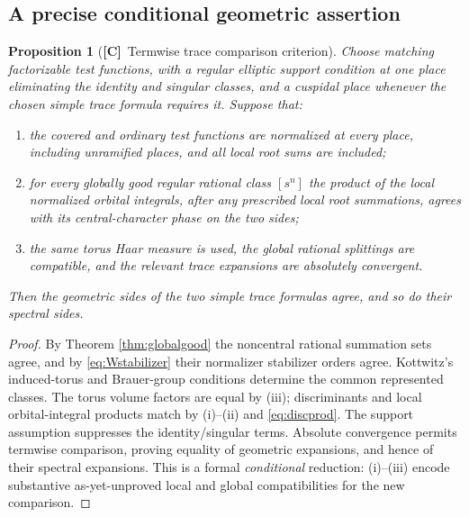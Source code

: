 \documentclass[11pt]{article}
\newcommand{\Ctag}{\textnormal{\textbf{[C]}}}
\theoremstyle{plain}
\newtheorem{proposition}[theorem]{Proposition}
\theoremstyle{definition}
\begin{document}
\subsection{A precise conditional geometric assertion}
\begin{proposition}[\Ctag\ Termwise trace comparison criterion]\label{prop:conditionalglobal}
Choose matching factorizable test functions, with a regular elliptic
support condition at one place eliminating the identity and singular
classes, and a cuspidal place whenever the chosen simple trace
formula requires it.  Suppose that:
\begin{enumerate}[label=(\roman*)]
\item the covered and ordinary test functions are normalized at every
place, including unramified places, and all local root sums are included;
\item for every globally good regular rational class $[s^n]$ the product
of the local normalized orbital integrals, after any prescribed
local root summations, agrees \emph{with its central-character
phase} on the two sides;
\item the same torus Haar measure is used, the global rational
splittings are compatible, and the relevant trace expansions are
absolutely convergent.
\end{enumerate}
Then the geometric sides of the two simple trace formulas agree,
and so do their spectral sides.
\end{proposition}
\begin{proof}
By Theorem \ref{thm:globalgood} the noncentral rational
summation sets agree, and by \eqref{eq:Wstabilizer} their normalizer
stabilizer orders agree.  Kottwitz's induced-torus and Brauer-group
conditions determine the common represented classes.  The torus
volume factors are equal by (iii); discriminants and local
orbital-integral products match by (i)--(ii) and
\eqref{eq:discprod}.  The support assumption suppresses the
identity/singular terms.  Absolute convergence permits termwise
comparison, proving equality of geometric expansions, and hence
of their spectral expansions.  This is a formal \emph{conditional}
reduction: (i)--(iii) encode substantive as-yet-unproved local and
global compatibilities for the new comparison.
\end{proof}
\end{document}
